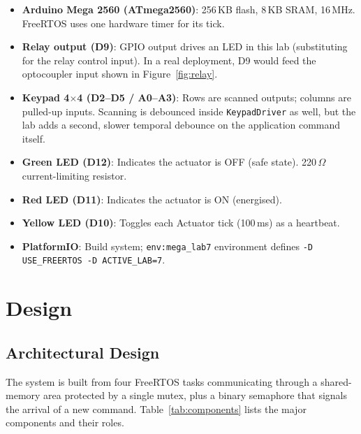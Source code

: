 \documentclass[12pt]{article}
\begin{document}
\begin{itemize}
  \item \textbf{Arduino Mega 2560 (ATmega2560)}: 256\,KB flash, 8\,KB SRAM, 16\,MHz. FreeRTOS uses one hardware timer for its tick.
  \item \textbf{Relay output (D9)}: GPIO output drives an LED in this lab (substituting for the relay control input). In a real deployment, D9 would feed the optocoupler input shown in Figure~\ref{fig:relay}.
  \item \textbf{Keypad 4$\times$4 (D2--D5 / A0--A3)}: Rows are scanned outputs; columns are pulled-up inputs. Scanning is debounced inside \texttt{KeypadDriver} as well, but the lab adds a second, slower temporal debounce on the application command itself.
  \item \textbf{Green LED (D12)}: Indicates the actuator is OFF (safe state). 220\,$\Omega$ current-limiting resistor.
  \item \textbf{Red LED (D11)}: Indicates the actuator is ON (energised).
  \item \textbf{Yellow LED (D10)}: Toggles each Actuator tick (100\,ms) as a heartbeat.
  \item \textbf{PlatformIO}: Build system; \texttt{env:mega\_lab7} environment defines \texttt{-D USE\_FREERTOS -D ACTIVE\_LAB=7}. \cite{pio}
\end{itemize}

\section{Design}

\subsection{Architectural Design}

The system is built from four FreeRTOS tasks communicating through a shared-memory area protected by a single mutex, plus a binary semaphore that signals the arrival of a new command. Table~\ref{tab:components} lists the major components and their roles.
\end{document}
